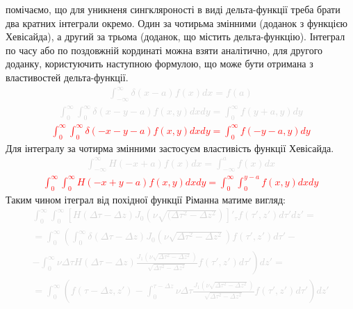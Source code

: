 помічаємо, що для уникненя сингкляроності в виді дельта-функції треба 
брати два кратних інтеграли окремо. Один за чотирьма змінними (доданок 
з функцією Хевісайда), а другий за трьома (доданок, що містить дельта-функцію).
Інтеграл по часу або по поздовжній кординаті можна взяти аналітично, для
другого доданку, користуючить наступною формулою, що може бути отримана з 
властивостей дельта-функції.
%
\textcolor{lightgray} { \begin{equation*} \begin{aligned}
\int_{-\infty}^{\infty} \delta(x-a) f(x) dx = f(a) 
\end{aligned} \end{equation*} }
%
\textcolor{lightgray} { \begin{equation*} \begin{aligned}
\int_0^\infty \int_0^\infty \delta(x-y-a) f(x,y) dx dy = 
\int_0^\infty f(y+a,y) dy
\end{aligned} \end{equation*} }
%
\textcolor{red} { \begin{equation*} \begin{aligned}
\int_0^\infty \int_0^\infty \delta(-x-y-a) f(x,y) dx dy = 
\int_0^\infty f(-y-a,y) dy
\end{aligned} \end{equation*} }
%
Для інтегралу за чотирма змінними застосуєм властивість функції Хевісайда.
%
\textcolor{lightgray} { \begin{equation*} \begin{aligned}
\int_{-\infty}^\infty H(-x+a) f(x) dx = 
\int_{-\infty}^{a} f(x) dx
\end{aligned} \end{equation*} }
%
\textcolor{red} { \begin{equation*} \begin{aligned}
\int_0^\infty \int_0^\infty H(-x+y-a) f(x,y) dx dy = 
\int_0^\infty \int_0^{y-a} f(x,y) dx dy
\end{aligned} \end{equation*} }
%
Таким чином ітеграл від похідної функції Ріманна матиме вигляд:
%
\textcolor{lightgray} { \begin{equation*} \begin{aligned}
\int_0^\infty \int_0^\infty \left[ H(\Delta \tau - \Delta z) 
J_0 \left( \nu \sqrt{(\Delta \tau^2 - \Delta z^2} \right) 
\right]'_\tau f(\tau',z') d \tau' dz' = \\
= \int_0^\infty \left( \int_0^\infty 
\delta \left( \Delta \tau - \Delta z \right)
J_0 \left( \nu \sqrt{\Delta \tau^2 - \Delta z^2} \right) 
f(\tau',z') d \tau' \right. - \\
- \left. \int_0^\infty \nu \Delta \tau H(\Delta \tau - \Delta z) 
\frac{J_1 \left( \nu \sqrt{\Delta \tau^2 - \Delta z^2} \right)}
{\sqrt{\Delta \tau^2 - \Delta z^2}} f(\tau',z') d \tau' \right) dz' = \\
= \int_0^\infty \left( f(\tau - \Delta z,z') - \int_0^{\tau - \Delta z} 
\nu \Delta \tau \frac{J_1 \left( \nu \sqrt{\Delta \tau^2 - \Delta z^2} \right)}
{\sqrt{\Delta \tau^2 - \Delta z^2}} f(\tau',z') d \tau' \right) dz'
\end{aligned} \end{equation*} }
